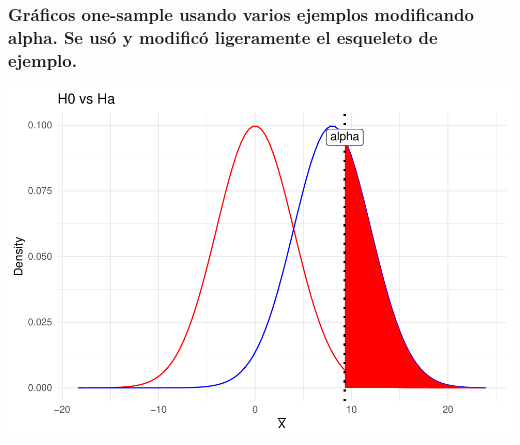 \documentclass[]{article}
\newenvironment{Shaded}{\begin{snugshade}}{\end{snugshade}}
\newcommand{\AttributeTok}[1]{\textcolor[rgb]{0.77,0.63,0.00}{#1}}
\newcommand{\DecValTok}[1]{\textcolor[rgb]{0.00,0.00,0.81}{#1}}
\newcommand{\FloatTok}[1]{\textcolor[rgb]{0.00,0.00,0.81}{#1}}
\newcommand{\FunctionTok}[1]{\textcolor[rgb]{0.00,0.00,0.00}{#1}}
\newcommand{\NormalTok}[1]{#1}
\newcommand{\OtherTok}[1]{\textcolor[rgb]{0.56,0.35,0.01}{#1}}
\newcommand{\SpecialCharTok}[1]{\textcolor[rgb]{0.00,0.00,0.00}{#1}}
\begin{document}
\hypertarget{graficos-one-sample-usando-varios-ejemplos-modificando-alpha.-se-uso-y-modifico-ligeramente-el-esqueleto-de-ejemplo.}{%
\subsubsection{Gráficos one-sample usando varios ejemplos modificando
alpha. Se usó y modificó ligeramente el esqueleto de
ejemplo.}\label{graficos-one-sample-usando-varios-ejemplos-modificando-alpha.-se-uso-y-modifico-ligeramente-el-esqueleto-de-ejemplo.}}

\begin{Shaded}
\end{Shaded}

\includegraphics{Enunciado_Tarea_3_files/figure-latex/unnamed-chunk-3-1.pdf}
\end{document}
